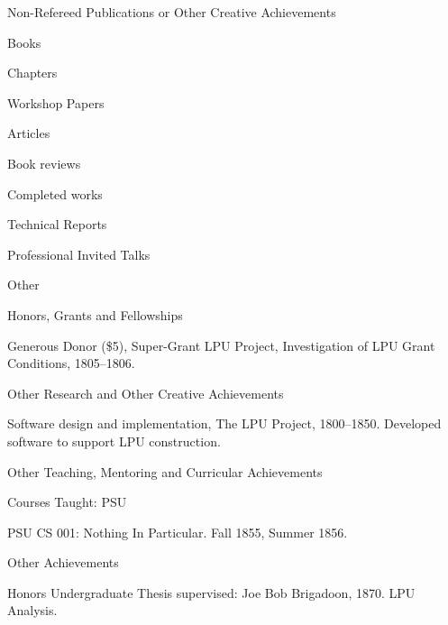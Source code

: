 \documentclass{psu-vita}
\begin{document}
%
\begin{majorhead}{Non-Refereed Publications or Other Creative Achievements}
  \begin{minorhead}{Books}
  \end{minorhead}
  \begin{minorhead}{Chapters}
  \end{minorhead}
  \begin{minorhead}{Workshop Papers}
  \end{minorhead}
  \begin{minorhead}{Articles}
  \end{minorhead}
  \begin{minorhead}{Book reviews}
  \end{minorhead}
  \begin{minorhead}{Completed works}
  \end{minorhead}
  \begin{minorhead}{Technical Reports}
  \end{minorhead}
  \begin{minorhead}{Professional Invited Talks}
  \end{minorhead}
  \begin{minorhead}{Other}
  \end{minorhead}
\end{majorhead}
%
\begin{majorhead}{Honors, Grants and Fellowships}
  \item Generous Donor (\$5), Super-Grant LPU Project,
        Investigation of LPU Grant Conditions, 1805--1806.
\end{majorhead} 
%
\begin{majorhead}{Other Research and Other Creative Achievements}
  \item Software design and implementation,
        The LPU Project, 1800--1850.  Developed 
        software to support LPU construction.
\end{majorhead}
%
\begin{majorhead}{Other Teaching, Mentoring and Curricular Achievements}
  \begin{minorhead}{Courses Taught: PSU}
    \item PSU CS 001: Nothing In Particular. Fall 1855,
      Summer 1856.
  \end{minorhead}
%
%
  \begin{minorhead}{Other Achievements}
    \item Honors Undergraduate Thesis supervised: Joe Bob
      Brigadoon, 1870. LPU Analysis.
  \end{minorhead}
\end{majorhead}
\end{document}

